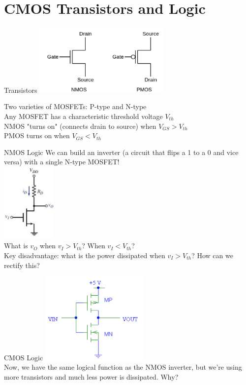 \section{CMOS Transistors and Logic}

\begin{frame}{Transistors}
	\includegraphics[width=0.5\textwidth]{./images/mos.png}
	    
	Two varieties of MOSFETs: P-type and N-type
	\\
	Any MOSFET has a characteristic threshold voltage $V_{th}$
	\\
	NMOS "turns on" (connects drain to source) when $V_{GS}>V_{th}$
	\\
	PMOS turns on when $V_{GS}<V_{th}$
\end{frame}
	
\begin{frame}{NMOS Logic}
	We can build an inverter (a circuit that flips a 1 to a 0 and vice versa) with a single N-type MOSFET! \\
	\includegraphics[width=0.2\textwidth]{./images/nmos-inverter.png}
	\\
	What is $v_O$ when $v_I>V_{th}$? When $v_I<V_{th}$?
	\\
	Key disadvantage: what is the power dissipated when $v_I>V_{th}$? How can we rectify this?
\end{frame}

\begin{frame}{CMOS Logic}
	\includegraphics[width=0.4\textwidth]{./images/cmos-inverter.png}
	\\
	Now, we have the same logical function as the NMOS inverter, but we're using more transistors and much less power is dissipated. Why?
\end{frame}

